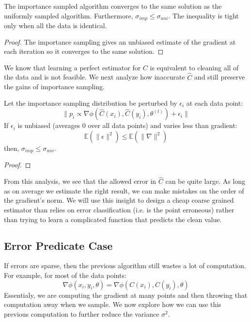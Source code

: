 \begin{theorem}
The importance sampled algorithm converges to the same solution as the uniformly sampled algorithm.
Furthermore, $\sigma_{imp} \le \sigma_{uni}$.
The inequality is tight only when all the data is identical.
\end{theorem}
\begin{proof}
The importance sampling gives an unbiased estimate of the gradient at each iteration so it converges to
the same solution.
\end{proof}

We know that learning a perfect estimator for $C$ is equivalent to cleaning all of the data and 
is not feasible.
We next analyze how inaccurate $\hat{C}$ and still preserve the gains of importance sampling.
\begin{theorem}
Let the importance sampling distribution be perturbed by $\epsilon_i$ at each data point: 
\[\|p_i \propto \nabla\phi(\hat{C}(x_{i}),\hat{C}(y_{i}),\theta^{(t)}) + \epsilon_i\|\]
If $\epsilon_i$ is unbiased (averages 0 over all data points) and
varies less than gradient:
\[
\mathbb{E}(\|\epsilon\|^2) \le \mathbb{E}(\|\nabla\|^2)
\]
then, $\sigma_{imp} \le \sigma_{uni}$.
\end{theorem}
\begin{proof}
\end{proof}

From this analysis, we see that the allowed error in $\hat{C}$ can be quite large. 
As long as on average we estimate the right result, we can make mistakes on the order of 
the gradient's norm.
We will use this insight to design a cheap coarse grained estimator than relies on error
classification (i.e. is the point erroneous) rather than trying to learn a complicated function
that predicts the clean value.

\subsection{Error Predicate Case}
If errors are sparse, then the previous algorithm still wastes a lot of computation.
For example, for most of the data points:
\[\nabla\phi(x_{i},y_{i}, \theta) = \nabla\phi(C(x_{i}),C(y_{i}),\theta)\]
Essentialy, we are computing the gradient at many points and then throwing that computation away when we sample.
We now explore how we can use this previous computation to further reduce the variance $\sigma^2$.

